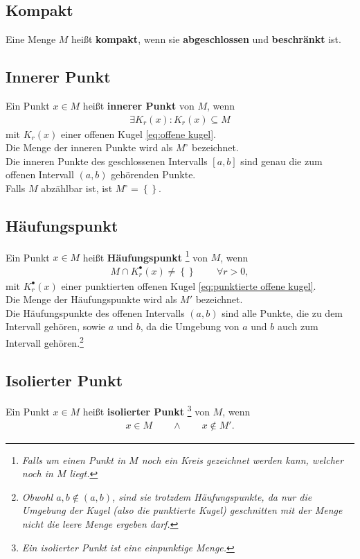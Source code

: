 \documentclass[a4paper,12pt]{article}
\numberwithin{equation}{section}
\begin{document}
\subsection{Kompakt}
Eine Menge $M$ heißt \textbf{kompakt}, wenn sie \textbf{abgeschlossen} und \textbf{beschränkt} ist.

\subsection{Innerer Punkt}
Ein Punkt $x \in M$ heißt \textbf{innerer Punkt} von $M$, wenn
\begin{align} 
        \exists K_r\left(x\right):K_r\left(x\right) \subseteq M\label{eq:innerer punkt}
\end{align} 
mit $K_r\left(x\right)$ einer offenen Kugel \eqref{eq:offene kugel}.\\\indent
Die Menge der inneren Punkte wird als $M^\circ$ bezeichnet.\\
Die inneren Punkte des geschlossenen Intervalls $\left[a,b\right]$ sind genau die zum offenen Intervall $\left(a,b\right)$ gehörenden Punkte.\\
Falls $M$ abzählbar ist, ist $M^\circ =\left\{\right\}$.

\subsection{Häufungspunkt}
Ein Punkt $x \in M$ heißt \textbf{Häufungspunkt}
\footnote{\textit{Falls um einen Punkt in $M$ noch ein Kreis gezeichnet werden kann, welcher noch in $M$ liegt.}}
von $M$, wenn 
\begin{align} 
        M\cap K_r^\bullet\left(x\right)\neq \left\{\right\}\qquad \,\forall r>0\label{eq:häufungspunkt}
,\end{align} 
mit $K_r^\bullet\left(x\right)$ einer punktierten offenen Kugel \eqref{eq:punktierte offene kugel}.\\\indent
Die Menge der Häufungspunkte wird als $M'$ bezeichnet.\\
Die Häufungspunkte des offenen Intervalls $\left(a,b\right)$ sind alle Punkte, die zu dem Intervall gehören, sowie $a$ und $b$, da die Umgebung von $a$ und $b$ auch zum Intervall gehören.\footnote{\textit{Obwohl $a,b \notin \left(a,b\right)$, sind sie trotzdem Häufungspunkte, da nur die Umgebung der Kugel (also die punktierte Kugel) geschnitten mit der Menge nicht die leere Menge ergeben darf.}}

\subsection{Isolierter Punkt}
Ein Punkt $x \in M$ heißt \textbf{isolierter Punkt}
\footnote{\textit{Ein isolierter Punkt ist eine einpunktige Menge.}}
von $M$, wenn
\begin{align} 
        x \in M\qquad \land \qquad x \notin M'\label{eq:isolierter punkt}
.\end{align} 
\end{document}
